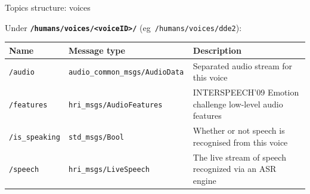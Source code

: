 \documentclass[xcolor=table]{beamer}
\begin{document}
\begin{frame}{Topics structure: voices}

    Under \textbf{\texttt{/humans/voices/<voiceID>/}} (eg~\texttt{/humans/voices/dde2}):

    \scriptsize
    \begin{tabular}{@{}llp{4cm}@{}}
        \toprule
        \textbf{Name} & \textbf{Message type}         & \textbf{Description}                                                \\ \midrule
        \texttt{/audio       } & \texttt{audio\_common\_msgs/AudioData  } & Separated audio stream for this voice                     \\
        \texttt{/features    } & \texttt{hri\_msgs/AudioFeatures} & INTERSPEECH’09 Emotion challenge low-level audio features \\
        \texttt{/is\_speaking} & \texttt{std\_msgs/Bool         } & Whether or not speech is recognised from this voice       \\
        \texttt{/speech      } & \texttt{hri\_msgs/LiveSpeech       } & The live stream of speech recognized via an ASR engine \\
        \bottomrule               
\end{tabular}
    
\end{frame}
\end{document}
